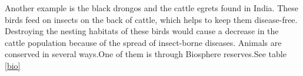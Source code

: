 \documentclass[a4paper,11pt]{report}
\begin{document}
Another example is the black drongos and the cattle egrets found in India. These birds feed on insects on the back of cattle, which helps to keep them disease-free. Destroying the nesting habitats of these birds would cause a decrease in the cattle population because of the spread of insect-borne diseases. 
Animals are conserved in several ways.One of them is through Biosphere reserves.See table \ref{bio} 
\begin{table}[h]
\centering
\label{bio}
\end{table}
\end{document}
